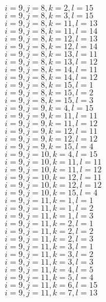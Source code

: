 \documentclass[14pt]{article}
\begin{document}
    $i=9,j=8,k=2,l=15 $ \\ 
    $i=9,j=8,k=3,l=15 $ \\ 
    $i=9,j=8,k=11,l=13 $ \\ 
    $i=9,j=8,k=11,l=14 $ \\ 
    $i=9,j=8,k=12,l=13 $ \\ 
    $i=9,j=8,k=12,l=14 $ \\ 
    $i=9,j=8,k=13,l=11 $ \\ 
    $i=9,j=8,k=13,l=12 $ \\ 
    $i=9,j=8,k=14,l=11 $ \\ 
    $i=9,j=8,k=14,l=12 $ \\ 
    $i=9,j=8,k=15,l=1 $ \\ 
    $i=9,j=8,k=15,l=2 $ \\ 
    $i=9,j=8,k=15,l=3 $ \\ 
    $i=9,j=9,k=4,l=15 $ \\ 
    $i=9,j=9,k=11,l=11 $ \\ 
    $i=9,j=9,k=11,l=12 $ \\ 
    $i=9,j=9,k=12,l=11 $ \\ 
    $i=9,j=9,k=12,l=12 $ \\ 
    $i=9,j=9,k=15,l=4 $ \\ 
    $i=9,j=10,k=4,l=15 $ \\ 
    $i=9,j=10,k=11,l=11 $ \\ 
    $i=9,j=10,k=11,l=12 $ \\ 
    $i=9,j=10,k=12,l=11 $ \\ 
    $i=9,j=10,k=12,l=12 $ \\ 
    $i=9,j=10,k=15,l=4 $ \\ 
    $i=9,j=11,k=1,l=1 $ \\ 
    $i=9,j=11,k=1,l=2 $ \\ 
    $i=9,j=11,k=1,l=3 $ \\ 
    $i=9,j=11,k=2,l=1 $ \\ 
    $i=9,j=11,k=2,l=2 $ \\ 
    $i=9,j=11,k=2,l=3 $ \\ 
    $i=9,j=11,k=3,l=1 $ \\ 
    $i=9,j=11,k=3,l=2 $ \\ 
    $i=9,j=11,k=3,l=3 $ \\ 
    $i=9,j=11,k=4,l=5 $ \\ 
    $i=9,j=11,k=5,l=4 $ \\ 
    $i=9,j=11,k=6,l=15 $ \\ 
    $i=9,j=11,k=7,l=13 $ \\ 
\end{document}
